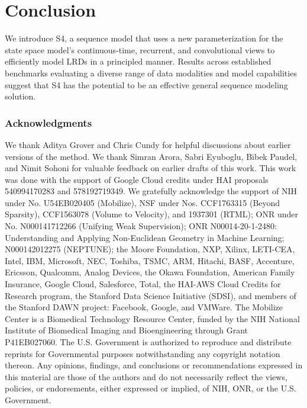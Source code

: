 \section{Conclusion}
\label{sec:conclusion}

We introduce S4, a sequence model that uses a new parameterization for the state space model's continuous-time, recurrent, and convolutional views to efficiently model LRDs in a principled manner. Results across established benchmarks evaluating a diverse range of data modalities and model capabilities suggest that S4 has the potential to be an effective general sequence modeling solution.

\subsubsection*{Acknowledgments}
We thank Aditya Grover and Chris Cundy for helpful discussions about earlier versions of the method. We thank Simran Arora, Sabri Eyuboglu, Bibek Paudel, and Nimit Sohoni for valuable feedback on earlier drafts of this work. This work was done with the support of Google Cloud credits under HAI proposals 540994170283 and 578192719349. We gratefully acknowledge the support of NIH under No. U54EB020405 (Mobilize), NSF under Nos. CCF1763315 (Beyond Sparsity), CCF1563078 (Volume to Velocity), and 1937301 (RTML); ONR under No. N000141712266 (Unifying Weak Supervision); ONR N00014-20-1-2480: Understanding and Applying Non-Euclidean Geometry in Machine Learning; N000142012275 (NEPTUNE); the Moore Foundation, NXP, Xilinx, LETI-CEA, Intel, IBM, Microsoft, NEC, Toshiba, TSMC, ARM, Hitachi, BASF, Accenture, Ericsson, Qualcomm, Analog Devices, the Okawa Foundation, American Family Insurance, Google Cloud, Salesforce, Total, the HAI-AWS Cloud Credits for Research program, the Stanford Data Science Initiative (SDSI), and members of the Stanford DAWN project: Facebook, Google, and VMWare. The Mobilize Center is a Biomedical Technology Resource Center, funded by the NIH National Institute of Biomedical Imaging and Bioengineering through Grant P41EB027060. The U.S. Government is authorized to reproduce and distribute reprints for Governmental purposes notwithstanding any copyright notation thereon. Any opinions, findings, and conclusions or recommendations expressed in this material are those of the authors and do not necessarily reflect the views, policies, or endorsements, either expressed or implied, of NIH, ONR, or the U.S. Government.


